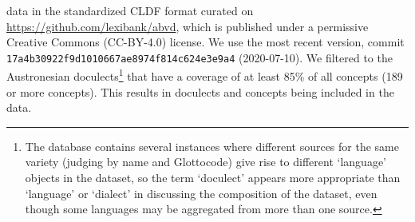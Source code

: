\documentclass[a4paper,12pt]{scrartcl}
\begin{document}
data in the standardized CLDF format \parencite{cldf} curated on \url{https://github.com/lexibank/abvd}, which is published under a
permissive Creative Commons (CC-BY-4.0) license. We use the most recent version, commit \texttt{17a4b30922f9d1010667ae8974f814c624e3e9a4}
(2020-07-10). We filtered to the Austronesian doculects\footnote{The database contains several instances where different
sources for the same variety (judging by name and Glottocode) give rise to different ‘language’ objects in the dataset, so the term
‘doculect’ appears more appropriate than ‘language’ or ‘dialect’ in discussing the composition of the dataset, even though some languages may be aggregated from more than one source.} that have a coverage
of at least 85\% of all concepts (189 or more concepts). This results in \countlects{} doculects and \countconcepts{} concepts being included in the data.
\end{document}
